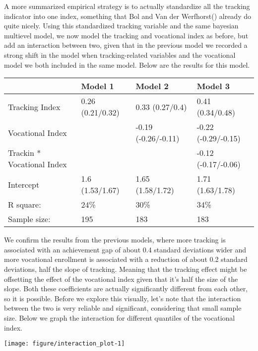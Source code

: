 \documentclass[11pt, a4paper]{article}\usepackage[]{graphicx}\usepackage[]{color}
\begin{document}
A more summarized empirical strategy is to actually standardize all the tracking indicator into one index, something that Bol and Van der Werfhorst() already do quite nicely. Using this standardized tracking variable and the same bayesian multievel model, we now model the tracking and vocational index as before, but add an interaction between two, given that in the previous model we recorded a strong shift in the model when tracking-related variables and the vocational model we both included in the same model. Below are the results for this model.



\begin{table}[ht]
\centering
\begin{tabular}{llll}
  \hline
  & Model 1 & Model 2 & Model 3 \\ 
  \hline
Tracking Index & 0.26 (0.21/0.32) & 0.33 (0.27/0.4) & 0.41 (0.34/0.48) \\ 
  Vocational Index &  & -0.19 (-0.26/-0.11) & -0.22 (-0.29/-0.15) \\ 
  Trackin * Vocational Index &  &  & -0.12 (-0.17/-0.06) \\ 
  Intercept & 1.6 (1.53/1.67) & 1.65 (1.58/1.72) & 1.71 (1.63/1.78) \\ 
   \hline R square: & 24\% & 30\% & 34\% \\ Sample size: & 195 & 183 & 183 \\ \hline \hline
\end{tabular}
\end{table}


We confirm the results from the previous models, where more tracking is associated with an achievement gap of about 0.4 standard deviations wider and more vocational enrollment is associated with a reduction of about 0.2 standard deviations, half the slope of tracking. Meaning that the tracking effect might be offsetting the effect of the vocational index given that it's half the size of the slope. Both these coefficients are actually significantly different from each other, so it is possible. Before we explore this visually, let's note that the interaction between the two is very reliable and significant, considering that small sample size. Below we graph the interaction for different quantiles of the vocational index.



{\centering \texttt{[image: figure/interaction\_plot-1]} 

}
\end{document}

